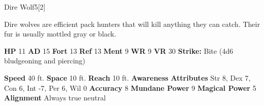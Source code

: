   \begin{monsection}{Dire Wolf}{5}[2]
    \vspace{-1em}\vspace{-1em}
    \vspace{0em}

    
      Dire wolves are efficient pack hunters that will kill anything they can catch.
      Their fur is usually mottled gray or black.
    
    

    \begin{spellcontent}
      \begin{spelltargetinginfo}
        \pari \textbf{HP} 11 \monsep
          \textbf{AD} 15 \monsep
          \textbf{Fort} 13 \monsep
          \textbf{Ref} 13 \monsep
          \textbf{Ment} 9
        \pari \textbf{WR} 9 \monsep
        \textbf{VR} 30
        \pari \textbf{Strike:}
            Bite  (4d6 bludgeoning and piercing)
      \end{spelltargetinginfo}
    \end{spellcontent}
    \begin{monsterfooter}
      \pari \textbf{Speed} 40 ft. \monsep
        \textbf{Space} 10 ft. \monsep
        \textbf{Reach} 10 ft.
      \pari \textbf{Awareness} 
      \pari \textbf{Attributes}
        Str 8, Dex 7,
        Con 6, Int -7,
        Per 6, Wil 0
      \pari \textbf{Accuracy} 8 \monsep
        \textbf{Mundane Power} 9 \monsep
      \textbf{Magical Power} 5
      \pari \textbf{Alignment} Always true neutral
    \end{monsterfooter}
  \end{monsection}
  
